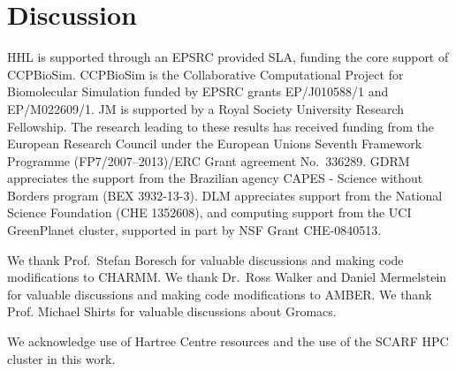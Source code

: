 \documentclass[journal=jctcce,manuscript=article]{achemso}
\begin{document}
\section{Discussion}
\label{sec:discuss}









\listoftodos


\begin{acknowledgement}
  HHL is supported through an EPSRC provided SLA, funding the core
  support of CCPBioSim.  CCPBioSim is the Collaborative Computational
  Project for Biomolecular Simulation funded by EPSRC grants
  EP/J010588/1 and EP/M022609/1.  JM is supported by a Royal Society
  University Research Fellowship.  The research leading to these
  results has received funding from the European Research Council
  under the European Unions Seventh Framework Programme
  (FP7/2007--2013)/ERC Grant agreement No.\ 336289.  GDRM appreciates
  the support from the Brazilian agency CAPES - Science without
  Borders program (BEX 3932-13-3).  DLM appreciates support from the
  National Science Foundation (CHE 1352608), and computing support
  from the UCI GreenPlanet cluster, supported in part by NSF Grant
  CHE-0840513.

  We thank Prof.\ Stefan Boresch for valuable discussions and making code
  modifications to CHARMM.  We thank Dr.\ Ross Walker and Daniel Mermelstein
  for valuable discussions and making code modifications to AMBER.  We thank
  Prof. Michael Shirts for valuable discussions about Gromacs.

  We acknowledge use of Hartree Centre resources and the use of the
  SCARF HPC cluster in this work.
\end{acknowledgement}



\end{document}
